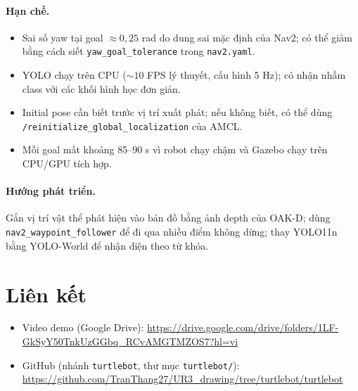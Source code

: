 \documentclass[a4paper,12pt]{article}
\begin{document}
\paragraph{Hạn chế.}
\begin{itemize}[nosep]
  \item Sai số yaw tại goal $\approx 0{,}25$ rad do dung sai mặc định của Nav2; có thể giảm bằng cách siết \texttt{yaw\_goal\_tolerance} trong \texttt{nav2.yaml}.
  \item YOLO chạy trên CPU ($\sim 10$ FPS lý thuyết, cấu hình 5 Hz); có nhận nhầm class với các khối hình học đơn giản.
  \item Initial pose cần biết trước vị trí xuất phát; nếu không biết, có thể dùng \texttt{/reinitialize\_global\_localization} của AMCL.
  \item Mỗi goal mất khoảng 85--90 s vì robot chạy chậm và Gazebo chạy trên CPU/GPU tích hợp.
\end{itemize}
\paragraph{Hướng phát triển.} Gắn vị trí vật thể phát hiện vào bản đồ bằng ảnh depth của OAK-D; dùng \texttt{nav2\_waypoint\_follower} để đi qua nhiều điểm không dừng; thay YOLO11n bằng YOLO-World để nhận diện theo từ khóa.

\section*{Liên kết}
\begin{itemize}[nosep]
  \item Video demo (Google Drive): \url{https://drive.google.com/drive/folders/1LF-GkSyY50TnkUzGGbq_RCvAMGTMZOS7?hl=vi}
  \item GitHub (nhánh \texttt{turtlebot}, thư mục \texttt{turtlebot/}): \url{https://github.com/TranThang27/UR3_drawing/tree/turtlebot/turtlebot}
\end{itemize}
\end{document}

